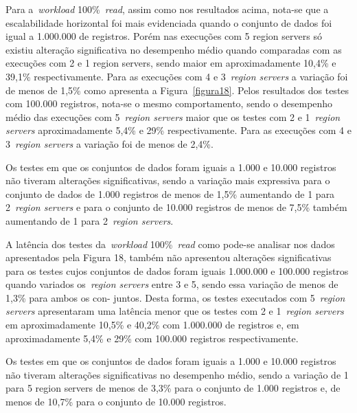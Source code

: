 \documentclass[12pt]{article}
\begin{document}
Para a~\emph{workload} 100\%~\emph{read}, assim como nos resultados acima, nota-se que a escalabilidade horizontal foi mais evidenciada quando o conjunto de dados foi igual a 1.000.000 de registros. 
Porém nas execuções com 5 region servers só existiu alteração significativa no desempenho médio quando comparadas com as execuções com 2 e 1 region servers, sendo maior em aproximadamente 10,4\% e 39,1\% respectivamente. 
Para as execuções com 4 e 3~\emph{region servers} a variação foi de menos de 1,5\% como apresenta a Figura~\ref{figura18}.
Pelos resultados dos testes com 100.000 registros, nota-se o mesmo comportamento, sendo o desempenho médio das execuções com 5~\emph{region servers} maior que os testes com 2 e 1~\emph{region servers} aproximadamente 5,4\% e 29\% respectivamente.
Para as execuções com 4 e 3~\emph{region servers} a variação foi de menos de 2,4\%.

Os testes em que os conjuntos de dados foram iguais a 1.000 e 10.000 registros não tiveram alterações significativas, sendo a variação mais expressiva para o conjunto de dados de 1.000 registros de menos de 1,5\% aumentando de 1 para 2~\emph{region servers} e para o conjunto de 10.000 registros de menos de 7,5\% também aumentando de 1 para 2~\emph{region servers}.

A latência dos testes da~\emph{workload} 100\%~\emph{read} como pode-se analisar nos dados apresentados pela Figura 18, também não apresentou alterações significativas para os testes cujos conjuntos de dados foram iguais 1.000.000 e 100.000 registros quando variados os~\emph{region servers} entre 3 e 5, sendo essa variação de menos de 1,3\% para ambos os con- juntos. Desta forma, os testes executados com 5~\emph{region servers} apresentaram uma latência menor que os testes com 2 e 1~\emph{region servers} em aproximadamente 10,5\% e 40,2\% com 1.000.000 de registros e, em aproximadamente 5,4\% e 29\% com 100.000 registros respectivamente.

Os testes em que os conjuntos de dados foram iguais a 1.000 e 10.000 registros não tiveram alterações significativas no desempenho médio, sendo a variação de 1 para 5 region servers de menos de 3,3\% para o conjunto de 1.000 registros e, de menos de 10,7\% para o conjunto de 10.000 registros.
\end{document}
